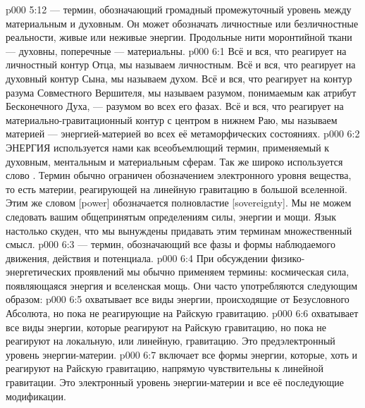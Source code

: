 \vs p000 5:12 \pc {} --- термин, обозначающий громадный промежуточный уровень между материальным и духовным. Он может обозначать личностные или безличностные реальности, живые или неживые энергии. Продольные нити моронтийной ткани --- духовны, поперечные --- материальны.
\vs p000 6:1 Всё и вся, что реагирует на личностный контур Отца, мы называем личностным. Всё и вся, что реагирует на духовный контур Сына, мы называем духом. Всё и вся, что реагирует на контур разума Совместного Вершителя, мы называем разумом, понимаемым как атрибут Бесконечного Духа, --- разумом во всех его фазах. Всё и вся, что реагирует на материально\hyp{}гравитационный контур с центром в нижнем Раю, мы называем материей --- энергией\hyp{}материей во всех её метаморфических состояниях.
\vs p000 6:2 \pc ЭНЕРГИЯ используется нами как всеобъемлющий термин, применяемый к духовным, ментальным и материальным сферам. Так же широко используется слово . Термин  обычно ограничен обозначением электронного уровня вещества, то есть материи, реагирующей на линейную гравитацию в большой вселенной. Этим же словом [power] обозначается полновластие [sovereignty]. Мы не можем следовать вашим общепринятым определениям силы, энергии и мощи. Язык настолько скуден, что мы вынуждены придавать этим терминам множественный смысл.
\vs p000 6:3 \pc {} --- термин, обозначающий все фазы и формы наблюдаемого движения, действия и потенциала.
\vs p000 6:4 При обсуждении физико\hyp{}энергетических проявлений мы обычно применяем термины: космическая сила, появляющаяся энергия и вселенская мощь. Они часто употребляются следующим образом:
\vs p000 6:5  охватывает все виды энергии, происходящие от Безусловного Абсолюта, но пока не реагирующие на Райскую гравитацию.
\vs p000 6:6  охватывает все виды энергии, которые реагируют на Райскую гравитацию, но пока не реагируют на локальную, или линейную, гравитацию. Это предэлектронный уровень энергии\hyp{}материи.
\vs p000 6:7  включает все формы энергии, которые, хоть и реагируют на Райскую гравитацию, напрямую чувствительны к линейной гравитации. Это электронный уровень энергии\hyp{}материи и все её последующие модификации.
